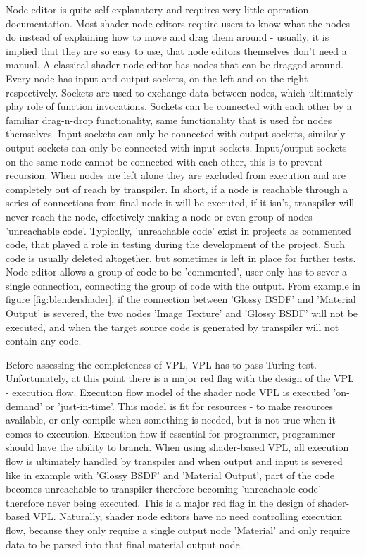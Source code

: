\documentclass{article}
\begin{document}
Node editor is quite self-explanatory and requires very little operation documentation. Most shader node editors require users to know what the nodes do instead of explaining how to move and drag them around - usually, it is implied that they are so easy to use, that node editors themselves don't need a manual.
A classical shader node editor has nodes that can be dragged around. Every node has input and output sockets, on the left and on the right respectively. Sockets are used to exchange data between nodes, which ultimately play role of function invocations. Sockets can be connected with each other by a familiar drag-n-drop functionality, same functionality that is used for nodes themselves. Input sockets can only be connected with output sockets, similarly output sockets can only be connected with input sockets. Input/output sockets on the same node cannot be connected with each other, this is to prevent recursion. When nodes are left alone they are excluded from execution and are completely out of reach by transpiler. In short, if a node is reachable through a series of connections from final node it will be executed, if it isn't, transpiler will never reach the node, effectively making a node or even group of nodes 'unreachable code'. Typically, 'unreachable code' exist in projects as commented code, that played a role in testing during the development of the project. Such code is usually deleted altogether, but sometimes is left in place for further tests. Node editor allows a group of code to be 'commented', user only has to sever a single connection, connecting the group of code with the output. From example in figure \ref{fig:blendershader}, if the connection between 'Glossy BSDF' and 'Material Output' is severed, the two nodes 'Image Texture' and 'Glossy BSDF' will not be executed, and when the target source code is generated by transpiler will not contain any code.

Before assessing the completeness of VPL\cite{kiper_1997_criteria}, VPL has to pass Turing test. Unfortunately, at this point there is a major red flag with the design of the VPL - execution flow. Execution flow model of the shader node VPL is executed 'on-demand' or 'just-in-time'. This model is fit for resources - to make resources available, or only compile when something is needed, but is not true when it comes to execution. Execution flow if essential for programmer, programmer should have the ability to branch. When using shader-based VPL, all execution flow is ultimately handled by transpiler and when output and input is severed like in example with 'Glossy BSDF' and 'Material Output', part of the code becomes unreachable to transpiler therefore becoming 'unreachable code' therefore never being executed. This is a major red flag in the design of shader-based VPL. Naturally, shader node editors have no need controlling execution flow, because they only require a single output node 'Material' and only require data to be parsed into that final material output node.
\end{document}
